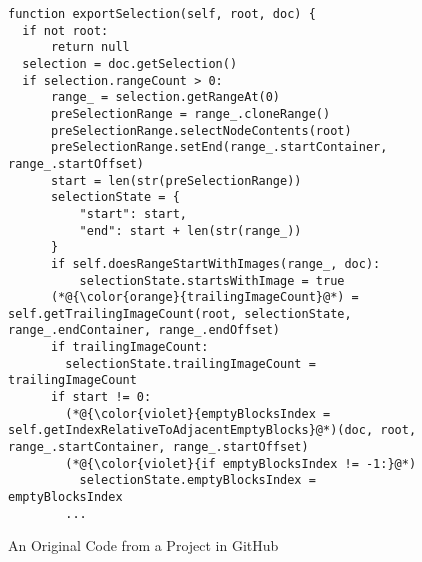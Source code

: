 \begin{figure}[t]
	\centering
	\begin{lstlisting}[]
function exportSelection(self, root, doc) {
  if not root: 
      return null
  selection = doc.getSelection()
  if selection.rangeCount > 0:
      range_ = selection.getRangeAt(0)
      preSelectionRange = range_.cloneRange()
      preSelectionRange.selectNodeContents(root)
      preSelectionRange.setEnd(range_.startContainer, range_.startOffset)
      start = len(str(preSelectionRange))
      selectionState = {
          "start": start,
          "end": start + len(str(range_))
      }
      if self.doesRangeStartWithImages(range_, doc):
          selectionState.startsWithImage = true
      (*@{\color{orange}{trailingImageCount}@*) = self.getTrailingImageCount(root, selectionState, range_.endContainer, range_.endOffset)
      if trailingImageCount:
        selectionState.trailingImageCount = trailingImageCount
      if start != 0:
        (*@{\color{violet}{emptyBlocksIndex = self.getIndexRelativeToAdjacentEmptyBlocks}@*)(doc, root, range_.startContainer, range_.startOffset)
        (*@{\color{violet}{if emptyBlocksIndex != -1:}@*) 
          selectionState.emptyBlocksIndex = emptyBlocksIndex
        ...
        \end{lstlisting}
\vspace{-12pt}
\caption{An Original Code from a Project in GitHub}
\label{example_org}
\end{figure}
